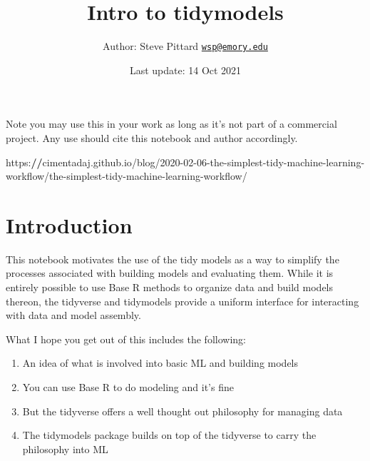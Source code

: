 \documentclass[
]{article}
\title{Intro to tidymodels}
\author{Author: Steve Pittard
\href{mailto:wsp@emory.edu}{\nolinkurl{wsp@emory.edu}}}
\date{Last update: 14 Oct 2021}
\newenvironment{Shaded}{\begin{snugshade}}{\end{snugshade}}
\newcommand{\DecValTok}[1]{\textcolor[rgb]{0.00,0.00,0.81}{#1}}
\newcommand{\ErrorTok}[1]{\textcolor[rgb]{0.64,0.00,0.00}{\textbf{#1}}}
\newcommand{\NormalTok}[1]{#1}
\newcommand{\SpecialCharTok}[1]{\textcolor[rgb]{0.00,0.00,0.00}{#1}}
\providecommand{\tightlist}{%
  \setlength{\itemsep}{0pt}\setlength{\parskip}{0pt}}
\begin{document}
\maketitle

Note you may use this in your work as long as it's not part of a
commercial project. Any use should cite this notebook and author
accordingly.

\begin{Shaded}
\begin{Highlighting}[]
\NormalTok{https}\SpecialCharTok{:}\ErrorTok{//}\NormalTok{cimentadaj.github.io}\SpecialCharTok{/}\NormalTok{blog}\SpecialCharTok{/}\DecValTok{2020{-}02{-}06}\SpecialCharTok{{-}}\NormalTok{the}\SpecialCharTok{{-}}\NormalTok{simplest}\SpecialCharTok{{-}}\NormalTok{tidy}\SpecialCharTok{{-}}\NormalTok{machine}\SpecialCharTok{{-}}\NormalTok{learning}\SpecialCharTok{{-}}\NormalTok{workflow}\SpecialCharTok{/}\NormalTok{the}\SpecialCharTok{{-}}\NormalTok{simplest}\SpecialCharTok{{-}}\NormalTok{tidy}\SpecialCharTok{{-}}\NormalTok{machine}\SpecialCharTok{{-}}\NormalTok{learning}\SpecialCharTok{{-}}\NormalTok{workflow}\SpecialCharTok{/}
\end{Highlighting}
\end{Shaded}

\hypertarget{introduction}{%
\section{Introduction}\label{introduction}}

This notebook motivates the use of the tidy models as a way to simplify
the processes associated with building models and evaluating them. While
it is entirely possible to use Base R methods to organize data and build
models thereon, the tidyverse and tidymodels provide a uniform interface
for interacting with data and model assembly.

What I hope you get out of this includes the following:

\begin{enumerate}
\def\labelenumi{\arabic{enumi})}
\tightlist
\item
  An idea of what is involved into basic ML and building models
\item
  You can use Base R to do modeling and it's fine
\item
  But the tidyverse offers a well thought out philosophy for managing
  data
\item
  The tidymodels package builds on top of the tidyverse to carry the
  philosophy into ML
\end{enumerate}
\end{document}
